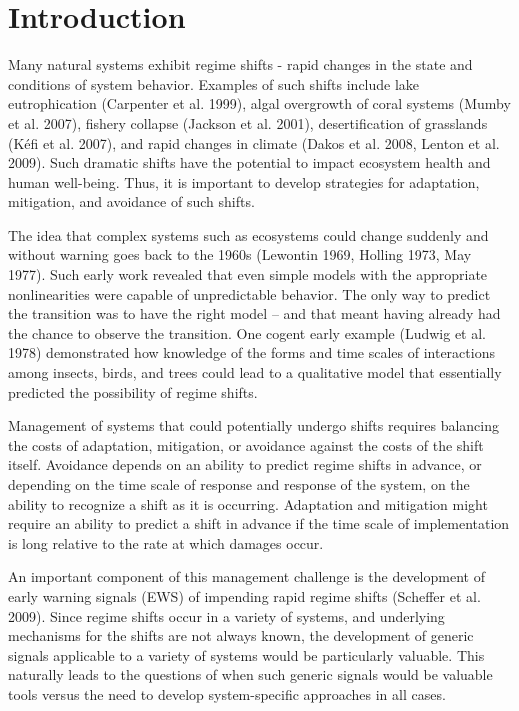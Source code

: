 \documentclass{article}
\begin{document}
\section{Introduction}

Many natural systems exhibit regime shifts - rapid changes in the state
and conditions of system behavior. Examples of such shifts include lake
eutrophication (Carpenter et al. 1999), algal overgrowth of coral
systems (Mumby et al. 2007), fishery collapse (Jackson et al. 2001),
desertification of grasslands (Kéfi et al. 2007), and rapid changes in
climate (Dakos et al. 2008, Lenton et al. 2009). Such dramatic shifts
have the potential to impact ecosystem health and human well-being.
Thus, it is important to develop strategies for adaptation, mitigation,
and avoidance of such shifts.

The idea that complex systems such as ecosystems could change suddenly
and without warning goes back to the 1960s (Lewontin 1969, Holling 1973,
May 1977). Such early work revealed that even simple models with the
appropriate nonlinearities were capable of unpredictable behavior. The
only way to predict the transition was to have the right model -- and
that meant having already had the chance to observe the transition. One
cogent early example (Ludwig et al. 1978) demonstrated how knowledge of
the forms and time scales of interactions among insects, birds, and
trees could lead to a qualitative model that essentially predicted the
possibility of regime shifts.

Management of systems that could potentially undergo shifts requires
balancing the costs of adaptation, mitigation, or avoidance against the
costs of the shift itself. Avoidance depends on an ability to predict
regime shifts in advance, or depending on the time scale of response and
response of the system, on the ability to recognize a shift as it is
occurring. Adaptation and mitigation might require an ability to predict
a shift in advance if the time scale of implementation is long relative
to the rate at which damages occur.

An important component of this management challenge is the development
of early warning signals (EWS) of impending rapid regime shifts
(Scheffer et al. 2009). Since regime shifts occur in a variety of
systems, and underlying mechanisms for the shifts are not always known,
the development of generic signals applicable to a variety of systems
would be particularly valuable. This naturally leads to the questions of
when such generic signals would be valuable tools versus the need to
develop system-specific approaches in all cases.
\end{document}
